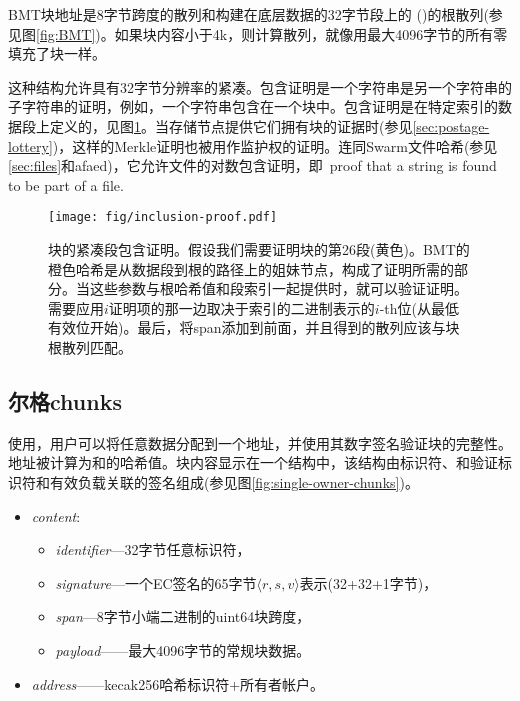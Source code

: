 BMT块地址是8字节跨度的散列和构建在底层数据的32字节段上的 ()的根散列(参见图\ref{fig:BMT})。如果块内容小于4k，则计算散列，就像用最大4096字节的所有零填充了块一样。

这种结构允许具有32字节分辨率的紧凑。包含证明是一个字符串是另一个字符串的子字符串的证明，例如，一个字符串包含在一个块中。包含证明是在特定索引的数据段上定义的，见图\ref{fig:chunk-inclusion}。当存储节点提供它们拥有块的证据时(参见\ref{sec:postage-lottery})，这样的Merkle证明也被用作监护权的证明。连同Swarm文件哈希(参见\ref{sec:files}和afaed)，它允许文件的对数包含证明，即\ proof that a string is found to be part of a file.\begin{figure}[htbp]
\centering
\texttt{[image: fig/inclusion-proof.pdf]}
\caption[块的紧凑段包含证明\statusgreen]{块的紧凑段包含证明。假设我们需要证明块的第26段(黄色)。BMT的橙色哈希是从数据段到根的路径上的姐妹节点，构成了证明所需的部分。当这些参数与根哈希值和段索引一起提供时，就可以验证证明。需要应用$i$证明项的那一边取决于索引的二进制表示的$i$-th位(从最低有效位开始)。最后，将span添加到前面，并且得到的散列应该与块根散列匹配。}
\label{fig:chunk-inclusion}
\end{figure}


\subsection{尔格chunks\statusgreen}\label{sec:single-owner-chunks}

使用，用户可以将任意数据分配到一个地址，并使用其数字签名验证块的完整性。地址被计算为和的哈希值。块内容显示在一个结构中，该结构由标识符、和验证标识符和有效负载关联的签名组成(参见图\ref{fig:single-owner-chunks})。

\begin{itemize}
    \item \emph{content}: 
\begin{itemize}
    \item \emph{identifier}—32字节任意标识符， 
    \item \emph{signature}—一个EC签名的65字节$\langle r,s,v \rangle$表示(32+32+1字节)，
    \item \emph{span}—8字节小端二进制的uint64块跨度，
    \item \emph{payload}——最大4096字节的常规块数据。
\end{itemize}
    \item \emph{address}——kecak256哈希标识符+所有者帐户。
\end{itemize}

